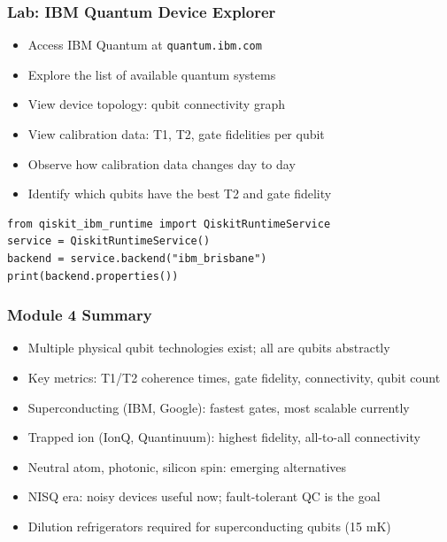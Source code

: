\begin{frame}[fragile]\frametitle{Lab: IBM Quantum Device Explorer}
\begin{itemize}
\item Access IBM Quantum at \texttt{quantum.ibm.com}
\item Explore the list of available quantum systems
\item View device topology: qubit connectivity graph
\item View calibration data: T1, T2, gate fidelities per qubit
\item Observe how calibration data changes day to day
\item Identify which qubits have the best T2 and gate fidelity
\end{itemize}
\begin{verbatim}
from qiskit_ibm_runtime import QiskitRuntimeService
service = QiskitRuntimeService()
backend = service.backend("ibm_brisbane")
print(backend.properties())
\end{verbatim}
\end{frame}

\begin{frame}[fragile]\frametitle{Module 4 Summary}
\begin{itemize}
\item Multiple physical qubit technologies exist; all are qubits abstractly
\item Key metrics: T1/T2 coherence times, gate fidelity, connectivity, qubit count
\item Superconducting (IBM, Google): fastest gates, most scalable currently
\item Trapped ion (IonQ, Quantinuum): highest fidelity, all-to-all connectivity
\item Neutral atom, photonic, silicon spin: emerging alternatives
\item NISQ era: noisy devices useful now; fault-tolerant QC is the goal
\item Dilution refrigerators required for superconducting qubits (15 mK)
\end{itemize}
\end{frame}
